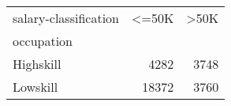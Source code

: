 \begin{tabular}{lrr}
\toprule
salary-classification &   <=50K &   >50K \\
occupation &         &        \\
\midrule
Highskill  &    4282 &   3748 \\
Lowskill   &   18372 &   3760 \\
\bottomrule
\end{tabular}
